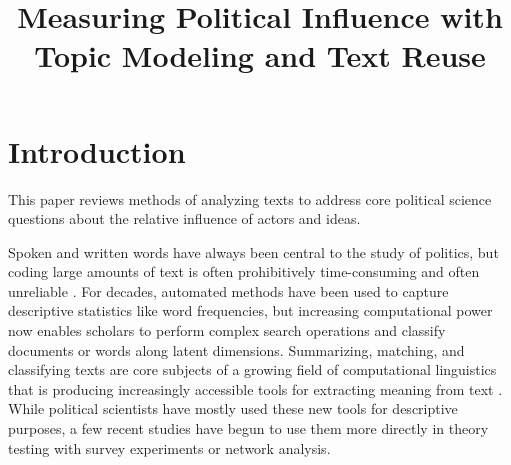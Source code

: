 \documentclass{article}
\title{Measuring Political Influence with Topic Modeling and Text Reuse}
\author{}
\begin{document}
\maketitle
\tableofcontents
\doublespace
\bigskip

\section{Introduction}
This paper reviews methods of analyzing texts to address core political science questions about the relative influence of actors and ideas.

Spoken and written words have always been central to the study of politics, but coding large amounts of text is often prohibitively time-consuming and often unreliable \citep{King2003}. For decades, automated methods have been used to capture descriptive statistics like word frequencies, but increasing computational power now enables scholars to perform complex search operations and classify documents or words along latent dimensions. Summarizing, matching, and classifying texts are core subjects of a growing field of computational linguistics that is producing increasingly accessible tools for extracting meaning from text \citep{Bird2009}. 
While political scientists have mostly used these new tools for descriptive purposes, a few recent studies have begun to use them more directly in theory testing with survey experiments or network analysis. 
\end{document}
